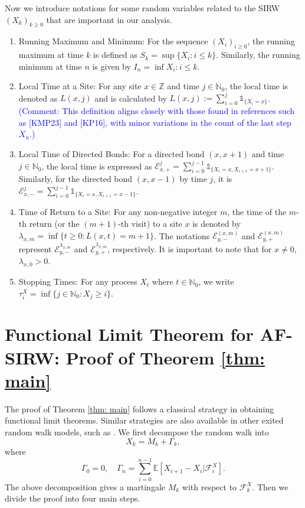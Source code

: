 \documentclass[twoside,12pt, a4paper]{article}
\numberwithin{equation}{section}
\theoremstyle{remark}
\newcommand{\comment}[1]{\textcolor{blue}{(Comment: #1)}}
\begin{document}
Now we introduce notations for some random variables related to the SIRW $(X_k)_{k\geq0}$ that are important in our analysis.
\begin{enumerate}
	\item Running Maximum and Minimum: For the sequence $(X_i)_{i \ge 0}$, the running maximum at time $k$ is defined as $S_k = \sup\{X_i : i \le k\}$. Similarly, the running minimum at time $n$ is given by $I_n = \inf {X_i: i \le k}$.
		\item
Local Time at a Site: For any site $x \in \mathbb{Z}$ and time $j \in \mathbb{N}_0$, the local time is denoted as $L(x,j)$ and is calculated by $L(x,j):= \sum_{i=0}^j \mathbb{1}_{\{X_i=x\}}$. 
\comment{This definition aligns closely with those found in references such as [KMP23] and [KP16], with minor variations in the count of the last step $X_n$.}
\item
Local Time of Directed Bonds: For a directed bond $(x,x+1)$ and time $j \in \mathbb{N}_0$, the local time is expressed as $\mathcal{E}^j_{x,+} = \sum_{i=0}^{j-1} \mathbb{1}_{\{X_i=x, X_{i+1} =x+1\}}$. Similarly, for the directed bond $(x,x-1)$ by time $j$, it is $\mathcal{E}^j_{x,-} = \sum_{i=0}^{j-1} \mathbb{1}_{\{X_i=x, X_{i+1} =x-1\}}$.
\item
Time of Return to a Site: For any non-negative integer $m$, the time of the $m$-th return (or the $(m+1)$-th visit) to a site $x$ is denoted by $\lambda_{x,m} = \inf\{t \geq 0: L(x,t) = m+1\}$. The notations $\mathcal{E}^{(x,m)}_{y, -}$ and $\mathcal{E}^{(x,m)}_{y, +}$ represent $\mathcal{E}^{\lambda_{x,m}}_{y,-}$ and $\mathcal{E}^{\lambda_{x,m}}_{y,+}$, respectively. It is important to note that for $x\neq 0$, $\lambda_{x,0} > 0$.
\item
Stopping Times: For any process $X_t$ where $t \in \mathbb{N}_0$, we write $\tau^X_{i} = \inf \{j \in  \mathbb{N}_0: X_j \ge  i\}$.
\end{enumerate}
	\section{Functional Limit Theorem for AF-SIRW: Proof of Theorem \ref{thm: main}}
	\label{sec: proof of main}
	
	The proof of Theorem \ref{thm: main} follows a classical strategy in obtaining functional limit theorems. 
	Similar strategies are also available in other exited random walk models, such as \cite{KP16,KMP23}.
	We first decompose the random walk into
	\begin{equation}
		\label{eqn:decomposition}
		X_k = M_k+ \Gamma_k 
		,\end{equation} 
	where
	\[ 
	\Gamma_0 = 0, \quad \Gamma_n = \sum_{i=0}^{n-1} \mathbb{E}\left[ X_{i+1}-X_i | \mathcal{F}_i^X 
	\right].
	\]
	The above decomposition gives a martingale $M_k$ with respect to $\mathcal{F}_k^X.$ 
	Then we divide the proof into four main steps. 
	
\end{document}
